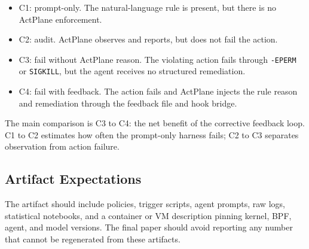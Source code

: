 \begin{itemize}
\item C1: prompt-only. The natural-language rule is present, but there is no
ActPlane enforcement.
\item C2: audit. ActPlane observes and reports, but does not fail the action.
\item C3: fail without ActPlane reason. The violating action fails through
\texttt{-EPERM} or \texttt{SIGKILL}, but the agent receives no structured
remediation.
\item C4: fail with feedback. The action fails and ActPlane injects the rule
reason and remediation through the feedback file and hook bridge.
\end{itemize}

The main comparison is C3 to C4: the net benefit of the corrective feedback
loop. C1 to C2 estimates how often the prompt-only harness fails; C2 to C3
separates observation from action failure.

\subsection{Artifact Expectations}

The artifact should include policies, trigger scripts, agent prompts, raw logs,
statistical notebooks, and a container or VM description pinning kernel, BPF,
agent, and model versions. The final paper should avoid reporting any number
that cannot be regenerated from these artifacts.
